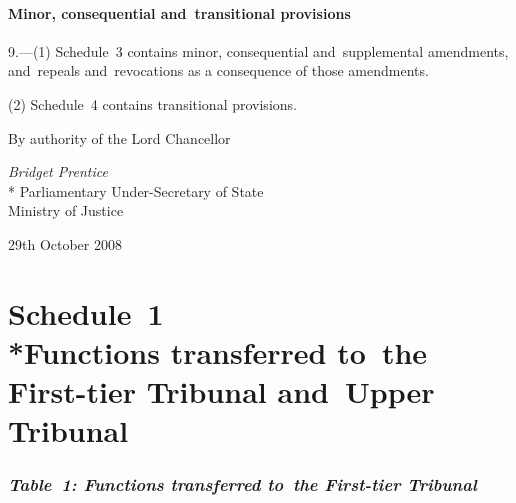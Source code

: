 \documentclass[12pt,a4paper]{article}
\begin{document}
\subsection[9. Minor, consequential and~transitional provisions]{Minor, consequential and~transitional provisions}

9.---(1)  Schedule~3 contains minor, consequential and~supplemental amendments, and~repeals and~revocations as a consequence of those amendments.

(2) Schedule~4 contains transitional provisions. 

\bigskip

By authority of the Lord Chancellor

{\raggedleft
\emph{Bridget Prentice}\\*
Parliamentary Under-Secretary 
of State\\%
Ministry of Justice

}

29th October 2008

\small

\part[Schedule~1 --- Functions transferred to~the First-tier Tribunal and~Upper Tribunal]{Schedule~1\\*Functions transferred to~the First-tier Tribunal and~Upper Tribunal}

\renewcommand\parthead{--- Schedule~1}

\section*{\itshape Table~1: Functions transferred to~the First-tier Tribunal}
\end{document}
